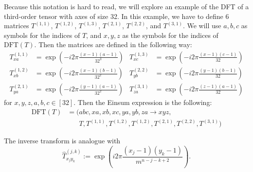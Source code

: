 Because this notation is hard to read, we will explore an example of the DFT of a third-order tensor with axes of size 32.
In this example, we have to define 6 matrices $T^{(1,1)}$, $T^{(1,2)}$, $T^{(1,3)}$, $T^{(2,1)}$, $T^{(2, 2)}$, and $T^{(3,1)}$.
We will use $a,b,c$ as symbols for the indices of $T$, and $x,y,z$ as the symbols for the indices of $\text{DFT}(T)$.
Then the matrices are defined in the following way:
\begin{align*}
    T^{(1,1)}_{xa} & = \exp\left(-i2\pi \frac{(x - 1)(a - 1)}{32^3}\right) & T^{(1,3)}_{xc} & = \exp\left(-i2\pi \frac{(x - 1)(c - 1)}{32}\right) \\
    T^{(1,2)}_{xb} & = \exp\left(-i2\pi \frac{(x - 1)(b - 1)}{32^2}\right) & T^{(2,2)}_{yb} & = \exp\left(-i2\pi \frac{(y - 1)(b - 1)}{32}\right) \\
    T^{(2,1)}_{ya} & = \exp\left(-i2\pi \frac{(y - 1)(a - 1)}{32^2}\right) & T^{(3,1)}_{za} & = \exp\left(-i2\pi \frac{(z - 1)(a - 1)}{32}\right)
\end{align*}
for $x, y, z, a, b, c \in [32]$.
Then the Einsum expression is the following:
\begin{align*}
    \text{DFT}(T) & = (abc, xa, xb, xc, ya, yb, za \rightarrow xyz,                                     \\
                  & \phantom{{}=(} T, T^{(1,1)}, T^{(1,2)}, T^{(1,2)}, T^{(2,1)}, T^{(2,2)}, T^{(3,1)})
\end{align*}

The inverse transform is analogue with
$$\hat{T}^{(j,k)}_{x_j y_k} := \exp\left(i2\pi \frac{(x_j - 1) (y_k - 1)}{m^{n - j - k + 2}}\right).$$
